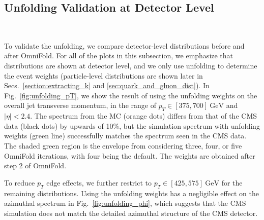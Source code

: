 \documentclass[aps,prd,twocolumn,preprintnumbers,nofootinbib,longbibliography,floatfix]{revtex4-1}
\DeclareRobustCommand{\Sec}[1]{Sec.~\ref{#1}}
\DeclareRobustCommand{\Secs}[2]{Secs.~\ref{#1} and \ref{#2}}
\DeclareRobustCommand{\Fig}[1]{Fig.~\ref{#1}}
\newcommand{\GeV}{\text{GeV}}
\newcommand{\OmniFold}{{\sc OmniFold}\xspace}
\newcommand{\cor}[1]{#1}
\newcommand{\cortwo}[1]{#1}
\begin{document}
\subsection{Unfolding Validation \cortwo{at Detector Level}}
\label{sec:unfolding_validation}


\begin{figure*}[p]
\centering
{}
\subfloat[]{\texttt{[image: N95]}\label{fig:unfolding_n95}}
\\
%
%
\caption{Similar to \Fig{fig:unfolding_jet}, but for the six substructure observables from \Sec{subsec:observables}.
%
Here, we are using a narrower jet $p_T$ and pseudorapidity range to mitigate edge effects in the unfolding.
}
\label{fig:unfoldedobs}
\end{figure*}



To validate the unfolding, we compare detector-level distributions before and after \OmniFold.
%
\cor{For all of the plots in this subsection, we emphasize that distributions are shown at detector level, and we only use unfolding to determine the event weights (particle-level distributions are shown later in \Secs{section:extracting_k}{sec:quark_and_gluon_dist}).}
%
In \Fig{fig:unfolding_pT}, we show the result of 
\cor{using the unfolding weights} on the overall jet transverse momentum, in the range of $p_T \in [375,700]~\GeV$ and $|\eta| < 2.4$.
%
The spectrum from the MC (orange dots) differs from that of the CMS data (black dots) by upwards of 10\%, but the %
\cortwo{simulation} \cor{spectrum with unfolding weights} (green line) successfully matches the spectrum \cortwo{seen in the CMS data}.
%
The shaded green region is the envelope from considering three, four, or five \OmniFold iterations, with four being the default.
%
\cortwo{The weights are obtained after step 2 of \OmniFold.}



To reduce $p_T$ edge effects, we further restrict to $p_T \in [425,575]~\GeV$ for the remaining distributions.
%
\cor{Using the unfolding weights} has a negligible effect on the azimuthal spectrum in \Fig{fig:unfolding_phi}, which suggests that the CMS simulation does not match the detailed azimuthal structure of the CMS detector.
\end{document}
